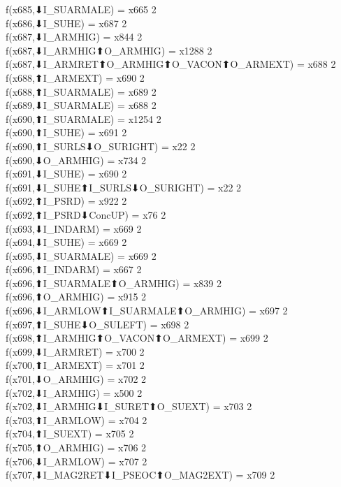 f(x685,⬇I_SUARMALE) = x665 {2} \\
f(x686,⬇I_SUHE) = x687 {2} \\
f(x687,⬇I_ARMHIG) = x844 {2} \\
f(x687,⬇I_ARMHIG⬆O_ARMHIG) = x1288 {2} \\
f(x687,⬇I_ARMRET⬆O_ARMHIG⬆O_VACON⬆O_ARMEXT) = x688 {2} \\
f(x688,⬆I_ARMEXT) = x690 {2} \\
f(x688,⬆I_SUARMALE) = x689 {2} \\
f(x689,⬇I_SUARMALE) = x688 {2} \\
f(x690,⬆I_SUARMALE) = x1254 {2} \\
f(x690,⬆I_SUHE) = x691 {2} \\
f(x690,⬆I_SURLS⬇O_SURIGHT) = x22 {2} \\
f(x690,⬇O_ARMHIG) = x734 {2} \\
f(x691,⬇I_SUHE) = x690 {2} \\
f(x691,⬇I_SUHE⬆I_SURLS⬇O_SURIGHT) = x22 {2} \\
f(x692,⬆I_PSRD) = x922 {2} \\
f(x692,⬆I_PSRD⬇ConcUP) = x76 {2} \\
f(x693,⬇I_INDARM) = x669 {2} \\
f(x694,⬇I_SUHE) = x669 {2} \\
f(x695,⬇I_SUARMALE) = x669 {2} \\
f(x696,⬆I_INDARM) = x667 {2} \\
f(x696,⬆I_SUARMALE⬆O_ARMHIG) = x839 {2} \\
f(x696,⬆O_ARMHIG) = x915 {2} \\
f(x696,⬇I_ARMLOW⬆I_SUARMALE⬆O_ARMHIG) = x697 {2} \\
f(x697,⬆I_SUHE⬇O_SULEFT) = x698 {2} \\
f(x698,⬆I_ARMHIG⬆O_VACON⬆O_ARMEXT) = x699 {2} \\
f(x699,⬇I_ARMRET) = x700 {2} \\
f(x700,⬆I_ARMEXT) = x701 {2} \\
f(x701,⬇O_ARMHIG) = x702 {2} \\
f(x702,⬇I_ARMHIG) = x500 {2} \\
f(x702,⬇I_ARMHIG⬇I_SURET⬆O_SUEXT) = x703 {2} \\
f(x703,⬆I_ARMLOW) = x704 {2} \\
f(x704,⬆I_SUEXT) = x705 {2} \\
f(x705,⬆O_ARMHIG) = x706 {2} \\
f(x706,⬇I_ARMLOW) = x707 {2} \\
f(x707,⬇I_MAG2RET⬇I_PSEOC⬆O_MAG2EXT) = x709 {2} \\

